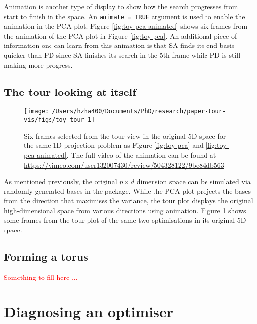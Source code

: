 Animation is another type of display to show how the search progresses
from start to finish in the space. An \texttt{animate\ =\ TRUE} argument
is used to enable the animation in the PCA plot. Figure
\ref{fig:toy-pca-animated} shows six frames from the animation of the
PCA plot in Figure \ref{fig:toy-pca}. An additional piece of information
one can learn from this animation is that SA finds its end basis quicker
than PD since SA finishes its search in the 5th frame while PD is still
making more progress.

\hypertarget{the-tour-looking-at-itself}{%
\subsection{The tour looking at
itself}\label{the-tour-looking-at-itself}}

\begin{Schunk}
\begin{figure}

{\centering \texttt{[image: /Users/hzha400/Documents/PhD/research/paper-tour-vis/figs/toy-tour-1]} 

}

\caption{Six frames selected from the tour view in the original 5D space for the same 1D projection problem as Figure \ref{fig:toy-pca} and \ref{fig:toy-pca-animated}. The full video of the animation can be found at \url{https://vimeo.com/user132007430/review/504328122/9be84db563}}\label{fig:toy-tour}
\end{figure}
\end{Schunk}

As mentioned previously, the original \(p \times d\) dimension space can
be simulated via randomly generated bases in the 
\citep{geozoo} package. While the PCA plot projects the bases from the
direction that maximises the variance, the tour plot displays the
original high-dimensional space from various directions using animation.
Figure \ref{fig:toy-tour} shows some frames from the tour plot of the
same two optimisations in its original 5D space.

\hypertarget{forming-a-torus}{%
\subsection{Forming a torus}\label{forming-a-torus}}

\textcolor{red}{Something to fill here ...}

\hypertarget{application}{%
\section{Diagnosing an optimiser}\label{application}}

